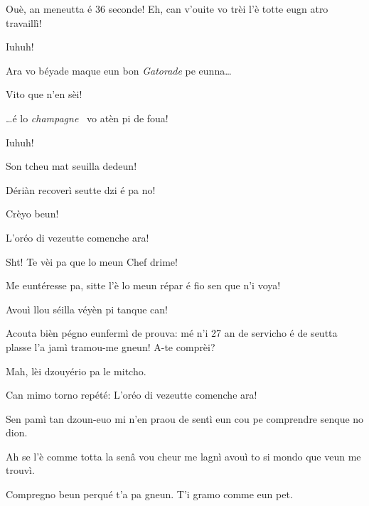 \begin{drama}
\Starterspeaks Ouè, an meneutta é 36 seconde! Eh, can v'ouite vo trèi l’è totte eugn atro travaillì! 

\Fennepulisiespeaks Iuhuh!

\Starterspeaks Ara vo béyade maque eun bon \textit{Gatorade} pe eunna\ldots

\FennepulisieCspeaks Vito que n'en sèi!


\Starterspeaks \ldots é lo \textit{champagne} \champagne\ vo atèn pi de foua!

\Fennepulisiespeaks Iuhuh!


\Gerominespeaks Son tcheu mat seuilla dedeun!

\Casimirspeaks Dériàn recoverì seutte dzi é pa no!

\Gerominespeaks Crèyo beun!



\Eunfeurmiespeaks {} L'oréo di vezeutte comenche ara!

\Eunfeurmispeaks Sht! Te vèi pa que lo meun Chef drime!

\Eunfeurmiespeaks {} Me euntéresse pa, sitte l'è lo meun répar é fio sen que n’i voya!

\Eunfeurmispeaks Avouì llou  séilla véyèn pi tanque can!

\Eunfeurmiespeaks Acouta bièn pégno eunfermì de prouva: mé n'i 27 an de servicho é de seutta plasse l’a jamì tramou-me gneun! A-te comprèi?

\Eunfeurmispeaks Mah, lèi dzouyério pa le mitcho.

\Eunfeurmiespeaks Can mimo torno repété:  L’oréo di vezeutte comenche ara!


\Gerominespeaks Sen pamì tan dzoun-euo mi n’en praou de sentì eun cou pe comprendre senque no dion.

\Casimirspeaks Ah se l’è comme totta la senâ vou cheur me lagnì avouì to si mondo que veun me trouvì.

\Gerominespeaks Compregno beun perqué t’a pa gneun. T’i gramo comme eun pet.


\end{drama}

